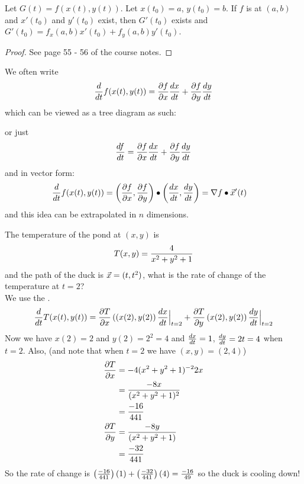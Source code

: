 \documentclass[english, 11pt]{article}
\begin{document}
\begin{thrm}\label{chain rule}
Let $G(t) = f(x(t), y(t))$. Let $x(t_0) = a$, $y(t_0) = b$. If $f$ is  at $(a,b)$ and $x'(t_0)$ and $y'(t_0)$ exist, then $G'(t_0)$ exists and $G'(t_0) = f_x(a,b)x'(t_0) + f_y(a,b)y'(t_0)$.
\end{thrm}

\begin{proof}
  See page 55 - 56 of the course notes.
\end{proof}

We often write
\[ \frac{d}{dt} f(x(t),y(t)) = \frac{\partial f}{\partial x} \frac{dx}{dt} + \frac{\partial f}{\partial y} \frac{dy}{dt} \]
which can be viewed as a tree diagram as such:
\begin{center}
\end{center}
or just
\[ \frac{df}{dt} = \frac{\partial f}{\partial x} \frac{dx}{dt} + \frac{\partial f}{\partial y} \frac{dy}{dt} \]
and in vector form:
\begin{align*}
  \frac{d}{dt}f(x(t),y(t)) & = \left( \frac{\partial f}{\partial x}, \frac{\partial f}{\partial y} \right) \bullet \left(\frac{dx}{dt}, \frac{dy}{dt}\right) = \nabla f \bullet \vec{x}'(t)
\end{align*}
and this idea can be extrapolated in $n$ dimensions.

\begin{exmp}
  The temperature of the pond at $(x,y)$ is
  \[ T(x,y) = \frac{4}{x^2 + y^2 + 1} \]
  and the path of the duck is $\vec{x} = (t,t^2)$, what is the rate of change of the temperature at $t = 2$? \\

  We use the .
  \begin{align*}
    \frac{d}{dt} T(x(t), y(t)) = \frac{\partial T}{\partial x} \left( (x(2), y(2) \right) \frac{dx}{dt} \Big|_{t=2} + \frac{\partial T}{\partial y} \left( x(2), y(2) \right) \frac{dy}{dt} \Big|_{t=2}
  \end{align*}
  Now we have $x(2) = 2$ and $y(2) = 2^2 = 4$ and $\frac{dx}{dt} = 1$, $\frac{dy}{dt} = 2t = 4$ when $t = 2$. Also, (and note that when $t=2$ we have $(x,y) = (2,4)$)
  \begin{align*}
    \frac{\partial T}{\partial x} & = -4(x^2 + y^2 + 1)^{-2} 2x \\
    & = \frac{-8x}{(x^2 + y^2 + 1)^2} \\
    & = \frac{-16}{441} \\
    \frac{\partial T}{\partial y} & = \frac{-8y}{(x^2+y^2+1)} \\
    & = \frac{-32}{441}
  \end{align*}
  So the rate of change is $\left( \frac{-16}{441} \right)(1) + \left( \frac{-32}{441} \right)(4) = \frac{-16}{49}$ so the duck is cooling down!
\end{exmp}
\end{document}
